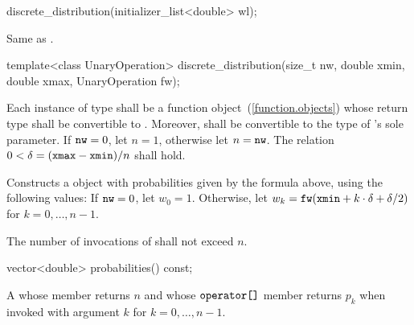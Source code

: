 %
\begin{itemdecl}
discrete_distribution(initializer_list<double> wl);
\end{itemdecl}

\begin{itemdescr}
\pnum\effects
 Same as .
\end{itemdescr}

\begin{itemdecl}
template<class UnaryOperation>
  discrete_distribution(size_t nw, double xmin, double xmax, UnaryOperation fw);
\end{itemdecl}

\begin{itemdescr}
\pnum\requires
 Each instance of type 
 shall be a function object~(\ref{function.objects})
 whose return type shall be convertible to .
 Moreover,
  shall be convertible
 to the type of 's sole parameter.
 If $ \texttt{nw} = 0 $, let $ n = 1 $, otherwise let $n = \texttt{nw}$.
 The relation
   $ 0 < \delta = (\texttt{xmax} - \texttt{xmin}) / n $
 shall hold.

\pnum\effects Constructs a  object
 with probabilities given by the formula above,
 using the following values:
 If $\texttt{nw} = 0$,
 let $ w_0 = 1 $.
 Otherwise,
 let $ w_k = \texttt{fw}(\texttt{xmin} + k \cdot \delta + \delta / 2) $
 for $ k = 0, \ldots, n\!-\!1 $.

\pnum\complexity
 The number of invocations of  shall not exceed $n$.
\end{itemdescr}

%
\begin{itemdecl}
vector<double> probabilities() const;
\end{itemdecl}

\begin{itemdescr}
\pnum\returns A 
 whose  member returns $n$
 and whose $ \texttt{operator[]} $ member returns $p_k$
 when invoked with argument $k$ for $k = 0, \ldots, n\!-\!1 $.
\end{itemdescr}



